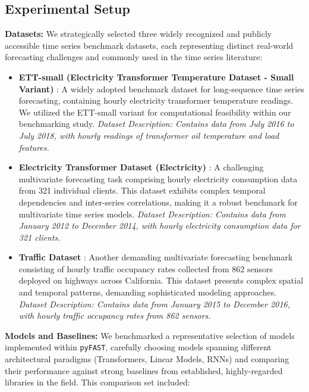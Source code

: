 \documentclass[twoside,11pt]{article}
\begin{document}
\subsection{Experimental Setup}

\textbf{Datasets:} We strategically selected three widely recognized and publicly accessible time series benchmark datasets, each representing distinct real-world forecasting challenges and commonly used in the time series literature:

\begin{itemize}
    \item    \textbf{ETT-small (Electricity Transformer Temperature Dataset - Small Variant)} \citep{haoyietal2021}:  A widely adopted benchmark dataset for long-sequence time series forecasting, containing hourly electricity transformer temperature readings.  We utilized the ETT-small variant for computational feasibility within our benchmarking study.  \textit{Dataset Description: Contains data from July 2016 to July 2018, with hourly readings of transformer oil temperature and load features.}
    \item    \textbf{Electricity Transformer Dataset (Electricity)} \citep{electricityloaddiagrams20112014_321}:  A challenging multivariate forecasting task comprising hourly electricity consumption data from 321 individual clients. This dataset exhibits complex temporal dependencies and inter-series correlations, making it a robust benchmark for multivariate time series models. \textit{Dataset Description: Contains data from January 2012 to December 2014, with hourly electricity consumption data for 321 clients.}
    \item  \textbf{Traffic Dataset} \citep{godahewa_2020_4656132}:  Another demanding multivariate forecasting benchmark consisting of hourly traffic occupancy rates collected from 862 sensors deployed on highways across California. This dataset presents complex spatial and temporal patterns, demanding sophisticated modeling approaches. \textit{Dataset Description: Contains data from January 2015 to December 2016, with hourly traffic occupancy rates from 862 sensors.}
\end{itemize}


\textbf{Models and Baselines:}  We benchmarked a representative selection of models implemented within \texttt{pyFAST}, carefully choosing models spanning different architectural paradigms (Transformers, Linear Models, RNNs) and comparing their performance against strong baselines from established, highly-regarded libraries in the field.  This comparison set included:
\end{document}
